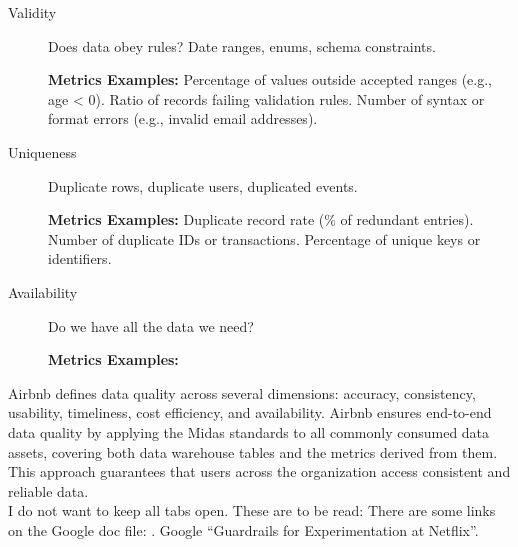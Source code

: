 \begin{description}
\item [Validity] Does data obey rules?
Date ranges, enums, schema constraints.

{\bf \color{red} Metrics Examples:} 
Percentage of values outside accepted ranges (e.g., age < 0).
Ratio of records failing validation rules.
Number of syntax or format errors (e.g., invalid email addresses).

\item [Uniqueness]
Duplicate rows, duplicate users, duplicated events.

{\bf \color{red} Metrics Examples:} 
Duplicate record rate (\% of redundant entries).
Number of duplicate IDs or transactions.
Percentage of unique keys or identifiers.

\item [Availability] Do we have all the data we need?

{\bf \color{red} Metrics Examples:} 

\end{description}

Airbnb defines data quality across several dimensions: accuracy, consistency, usability, timeliness, cost efficiency, and availability.
Airbnb ensures end-to-end data quality by applying the Midas standards to all commonly consumed data assets, covering both data warehouse tables and the metrics derived from them. This approach guarantees that users across the organization access consistent and reliable data.\\



I do not want to keep all tabs open. These are to be read:
There are some links on the Google doc file: .
Google ``Guardrails for Experimentation at Netflix''.

